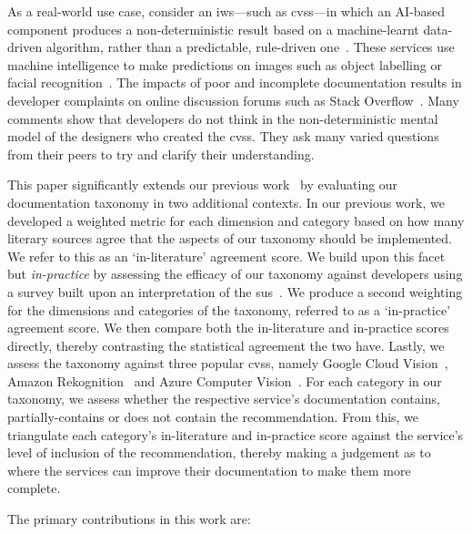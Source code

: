 As a real-world use case, consider an \gls{iws}---such as \glspl{cvs}---in which an AI-based component produces a non-deterministic result based on a machine-learnt data-driven algorithm, rather than a predictable, rule-driven one~\citep{Cummaudo:2019icsme}. These services use machine intelligence to make predictions on images such as object labelling or facial recognition~. The impacts of poor and incomplete documentation results in developer complaints on online discussion forums such as Stack Overflow~\citep{Cummaudo:2020icse}. Many comments show that developers do not think in the non-deterministic mental model of the designers who created the \glspl{cvs}. They ask many varied questions from their peers to try and clarify their understanding.

This paper significantly extends our previous work~\citep{Cummaudo:2019esem} by evaluating our  documentation taxonomy in two additional contexts. In our previous work, we developed a weighted metric for each dimension and category based on how many literary sources agree that the aspects of our taxonomy should be implemented. We refer to this as an `in-literature' agreement score. We build upon this facet but \textit{in-practice} by assessing the efficacy of our taxonomy against developers using a survey built upon an interpretation of the \gls{sus}~\citep{Brooke:1996ua}. We produce a second weighting for the dimensions and categories of the taxonomy, referred to as a `in-practice' agreement score. We then compare both the in-literature and in-practice scores directly, thereby contrasting the statistical agreement the two have. Lastly, we assess the taxonomy against three popular \glspl{cvs}, namely Google Cloud Vision~, Amazon Rekognition~ and Azure Computer Vision~. For each category in our taxonomy, we assess whether the respective service's documentation contains, partially-contains or does not contain the recommendation. From this, we triangulate each category's in-literature and in-practice score against the service's level of inclusion of the recommendation, thereby making a judgement as to where the services can improve their documentation to make them more complete.

The primary contributions in this work are:

